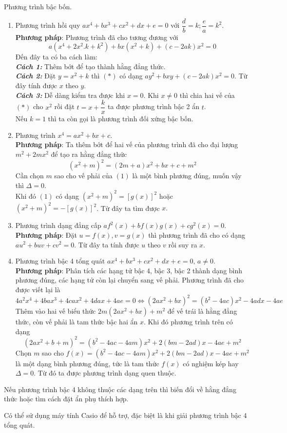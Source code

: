 \begin{dang}{Phương trình bậc bốn.}
\begin{enumerate}[1)]
	\item Phương trình hồi quy $ax^4+bx^3+cx^2+dx+e=0$ với $\dfrac{d}{b}=k;\dfrac{e}{a}=k^2$.\\
    \textbf{Phương pháp}: Phương trình đã cho tương đương với
\[a(x^4+2x^2.k+k^2)+bx(x^2+k)+(c-2ak)x^2=0 \tag{*} \] 
Đến đây ta có ba cách làm:\\
\textbf{\textit{Cách 1:}} Thêm bớt để tạo thành hằng đẳng thức.\\
\textbf{\textit{Cách 2:}} Đặt $y=x^2+k$ thì $(*)$ có dạng $ay^2+bxy+(c-2ak)x^2=0$. Từ đây tính được $x$ theo $y$.\\
\textbf{\textit{Cách 3:}} Dễ dàng kiểm tra được khi $x=0$. Khi $x \neq 0$ thì chia hai vế của $(*)$ cho $x^2$ rồi đặt $t=x+\dfrac{k}{x}$ ta được phương trình bậc 2 ẩn $t$.\\
Nếu $k=1$ thì ta còn gọi là phương trình đối xứng bậc bốn.
	\item Phương trình $x^4=ax^2+bx+c$.\\
    \textbf{Phương pháp}: Ta thêm bớt để hai vế của phương trình đã cho đại lượng $m^2+2mx^2$ để tạo ra hằng đẳng thức
\[(x^2+m)^2=(2m+a)x^2+bx+c+m^2 \tag{1}\] 
Cần chọn $m$ sao cho vế phải của $(1)$ là một bình phương đúng, muốn vậy thì $\Delta =0$.\\
Khi đó $(1)$ có dạng
$(x^2+m)^2=[g(x)]^2$ hoặc $(x^2+m)^2=-[g(x)]^2$. Từ đây ta tìm được $x.$
	\item Phương trình dạng đẳng cấp $af^2(x)+bf(x)g(x)+cg^2(x)=0$.\\
    \textbf{Phương pháp}: Đặt $u=f(x),v=g(x)$ thì phương trình đã cho có dạng $au^2+buv+cv^2=0$. Từ đây ta tính được $u$ theo $v$ rồi suy ra $x$.
    \item Phương trình bậc 4 tổng quát $ax^4+bx^3+cx^2+dx+e=0,\, a\neq 0$.\\
    \textbf{Phương pháp}: Phân tích các hạng tử bậc 4, bậc 3, bậc 2 thành dạng bình phương đúng, các hạng tử còn lại chuyển sang vế phải. Phương trình đã cho được viết lại là
$$4a^2x^4+4bax^3+4cax^2+4dax+4ae=0\Leftrightarrow (2ax^2+bx)^2=(b^2-4ac)x^2-4adx-4ae$$
Thêm vào hai vế biểu thức $2m(2ax^2+bx)+m^2$ để vế trái là hằng đẳng thức, còn vế phải là tam thức bậc hai ẩn $x$. Khi đó phương trình trên có dạng
$$(2ax^2+b+m)^2=(b^2-4ac-4am)x^2+2(bm-2ad)x-4ae+m^2$$
Chọn $m$ sao cho $f(x)=(b^2-4ac-4am)x^2+2(bm-2ad)x-4ae+m^2$ là một dạng bình phương đúng, tức là tam thức $f(x)$ có nghiệm kép hay $\Delta =0$. Từ đó ta được phương trình dạng quen thuộc.
    \end{enumerate}
    Nếu phương trình bậc 4 không thuộc các dạng trên thì biến đổi về hằng đẳng thức hoặc tìm cách đặt ẩn phụ thích hợp.
\begin{note}
    Có thể sử dụng máy tính Casio để hỗ trợ, đặc biệt là khi giải phương trình bậc 4 tổng quát.
\end{note}    
\end{dang}

